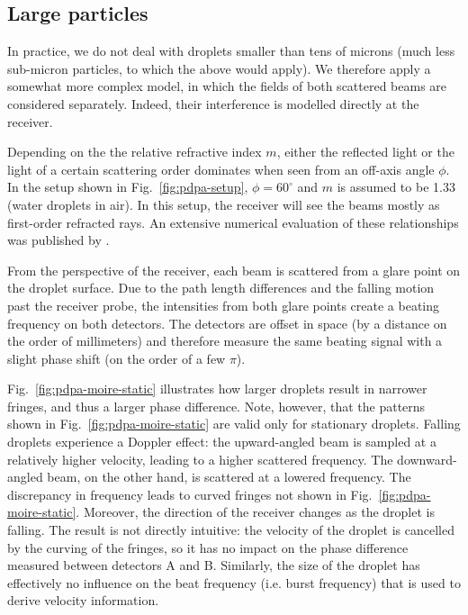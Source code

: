 \documentclass[11.5pt,oneside]{book}
\newcommand*{\figref}[1]{Fig.~\ref{#1}}
\begin{document}
\subsection{Large particles}
In practice, we do not deal with droplets smaller than tens of microns (much
less sub-micron particles, to which the above would apply). We therefore apply a
somewhat more complex model, in which the fields of both scattered beams are
considered separately. Indeed, their interference is modelled directly at the
receiver.

Depending on the the relative refractive index $m$, either the reflected light
or the light of a certain scattering order dominates when seen from an off-axis
angle $\phi$. In the setup shown in \figref{fig:pdpa-setup}, $\phi = 60^\circ$
and $m$ is assumed to be 1.33 (water droplets in air). In this setup, the
receiver will see the beams mostly as first-order refracted rays. An extensive
numerical evaluation of these relationships was published by \citet{Naqwi96}.

From the perspective of the receiver, each beam is scattered from a
glare point on the droplet surface. Due to the path length differences
and the falling motion past the receiver probe, the intensities from
both glare points create a beating frequency on both detectors.
The detectors are offset in space (by a distance on the order of
millimeters) and therefore measure the same beating signal with a slight phase
shift (on the order of a few $\pi$).

\figref{fig:pdpa-moire-static}
illustrates how larger droplets result in narrower fringes, and thus a
larger phase difference. Note, however, that the patterns shown in \figref{fig:pdpa-moire-static} are
valid only for stationary droplets. Falling droplets experience a Doppler
effect: the upward-angled beam is sampled at a relatively higher velocity,
leading to a higher scattered frequency. The downward-angled beam, on the other
hand, is scattered at a lowered frequency. The discrepancy in frequency leads to
curved fringes not shown in \figref{fig:pdpa-moire-static}. Moreover, the direction of the receiver changes as the droplet
is falling. The result is not directly intuitive: the velocity of the droplet is 
cancelled by the curving of the fringes, so it has no impact on the 
phase difference measured between detectors A and B. Similarly, the size of the
droplet has effectively no influence on the beat frequency (i.e. burst
frequency) that is used to derive velocity information.
\end{document}
